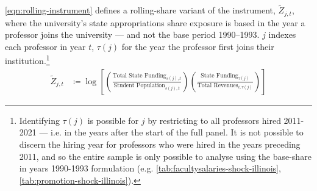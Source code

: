 \documentclass[notitlepage,12pt]{article}
\renewcommand{\tilde}[1]{\widetilde{#1}}                                   %
\begin{document}
\autoref{eqn:rolling-instrument} defines a rolling-share variant of the instrument, $\tilde Z_{j,t}$, where the university's state appropriations share exposure is based in the year a professor joins the university --- and not the base period 1990--1993.
$j$ indexes each professor in year $t$, $\tau(j)$ for the year the professor first joins their institution.\footnote{
    Identifying $\tau(j)$ is possible for $j$ by restricting to all professors hired 2011-2021 --- i.e. in the years after the start of the full panel.
    It is not possible to discern the hiring year for professors who  were hired in the years preceding 2011, and so the entire sample is only possible to analyse using the base-share in years 1990-1993 formulation (e.g. \autoref{tab:facultysalaries-shock-illinois}, \ref{tab:promotion-shock-illinois}).
}
\begin{align}
    \label{eqn:rolling-instrument}
    \tilde Z_{j,t} &\coloneqq \log \left[
    \left( \frac{\text{Total State Funding}_{s(j),t}}{\text{Student Population}_{s(j),t}} \right)
    \left( \frac{\text{State Funding}_{\tau(j)}}{\text{Total Revenues}_{i,\tau(j)}} \right) \right]
\end{align}
\end{document}
